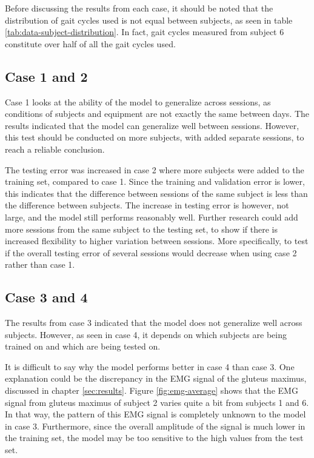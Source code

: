 \documentclass[../main.tex]{subfiles}
\begin{document}
Before discussing the results from each case, it should be noted that the distribution of gait cycles used is not equal between subjects, as seen in table \ref{tab:data-subject-distribution}. 
In fact, gait cycles measured from subject 6 constitute over half of all the gait cycles used.


\subsection{Case 1 and 2}
\label{sec:discussion-case1and2}
Case 1 looks at the ability of the model to generalize across sessions, as conditions of subjects and equipment are not exactly the same between days. 
The results indicated that the model can generalize well between sessions.
However, this test should be conducted on more subjects, with added separate sessions, to reach a reliable conclusion.

The testing error was increased in case 2 where more subjects were added to the training set, compared to case 1.
Since the training and validation error is lower, this indicates that the difference between sessions of the same subject is less than the difference between subjects.
The increase in testing error is however, not large, and the model still performs reasonably well.
Further research could add more sessions from the same subject to the testing set, to show if there is increased flexibility to higher variation between sessions.
More specifically, to test if the overall testing error of several sessions would decrease when using case 2 rather than case 1.

\subsection{Case 3 and 4}
\label{sec:discussion-case3and4}
The results from case 3 indicated that the model does not generalize well across subjects.
However, as seen in case 4, it depends on which subjects are being trained on and which are being tested on.

It is difficult to say why the model performs better in case 4 than case 3.
One explanation could be the discrepancy in the \ac{EMG} signal of the gluteus maximus, discussed in chapter \ref{sec:results}.
Figure \ref{fig:emg-average} shows that the \ac{EMG} signal from gluteus maximus of subject 2 varies quite a bit from subjects 1 and 6.
In that way, the pattern of this \ac{EMG} signal is completely unknown to the model in case 3.
Furthermore, since the overall amplitude of the signal is much lower in the training set, the model may be too sensitive to the high values from the test set.
\end{document}
